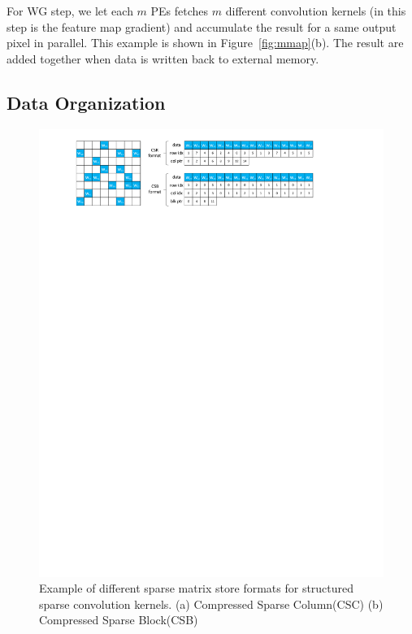 For WG step, we let each $m$ PEs fetches $m$ different convolution kernels (in this step is the feature map gradient) and accumulate the result for a same output pixel in parallel. This example is shown in Figure~\ref{fig:mmap}(b). The result are added together when data is written back to external memory. 

\subsection{Data Organization}
\begin{figure}[htb]
  \centering
  \includegraphics[width=2.0\columnwidth]{figures/csb.pdf}
  \caption{Example of different sparse matrix store formats for structured sparse convolution kernels. (a) Compressed Sparse Column(CSC) (b) Compressed Sparse Block(CSB)}
  \label{fig:csb}
\end{figure}

